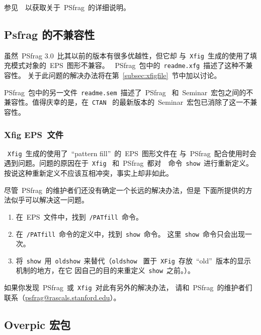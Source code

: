 参见~\cite{psfrag}~以获取关于~\textsf{PSfrag}~的详细说明。

\clearpage

\subsection{Psfrag 的不兼容性}\label{ssec:psfragcomp}

虽然~\textsf{PSfrag 3.0}~比其以前的版本有很多优越性，但它却
与~\texttt{Xfig}~生成的使用了填充模式对象的~EPS~图形不兼容。
~\textsf{PSfrag}~包中的~\texttt{readme.xfg}~描述了这种不兼容性。
关于此问题的解决办法将在第~\ref{subsec:xfigfile}~节中加以讨论。

\textsf{PSfrag}~包中的另一文件~\texttt{readme.sem}~描述了~\textsf{PSfrag}~
和~\textsf{Seminar}~宏包之间的不兼容性。值得庆幸的是，在~\texttt{CTAN}~
的最新版本的~\textsf{Seminar}~宏包已消除了这一不兼容性。

\subsubsection{Xfig EPS~文件}\label{sssec:xfigfile}

~\texttt{Xfig}~生成的使用了~``pattern fill''~的~EPS~图形文件在
与~\textsf{PSfrag}~配合使用时会遇到问题。问题的原因在于~\texttt{Xfig}~
和~\textsf{PSfrag}~都对~\PS~命令~\texttt{show}~进行重新定义。
按说这种重新定义不应该互相冲突，事实上却非如此。

尽管~\textsf{PSfrag}~的维护者们还没有确定一个长远的解决办法，但是
下面所提供的方法似乎可以解决这一问题。
\begin{enumerate}
\item 在~EPS~文件中，找到~\texttt{/PATfill}~命令。
\item 在~\texttt{/PATfill}~命令的定义中，找到~\texttt{show}~命令。
      这里~\texttt{show}~命令只会出现一次。
\item 将~\texttt{show}~用~\texttt{oldshow}~来替代（\texttt{oldshow}~
      置于~\texttt{XFig}~存放~``old''~版本的显示机制的地方，在它
      因自己的目的来重定义~\texttt{show}~之前。）。
\end{enumerate}
如果你发现~\textsf{PSfrag}~或~\texttt{Xfig}~对此有另外的解决办法，
请和~\textsf{PSfrag}~的维护者们联系（\href{mailto:psfrag@rascals.stanford.edu}%
{psfrag@rascals.stanford.edu}）。

\subsection{Overpic 宏包}\label{ssec:overpic}

